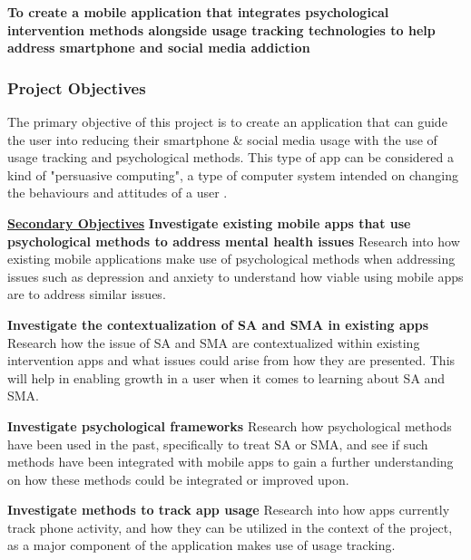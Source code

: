 \documentclass[12pt]{article}
\begin{document}
\noindent\textbf{To create a mobile application that integrates psychological intervention methods alongside usage 
tracking technologies to help address smartphone and social media addiction}

\subsubsection{Project Objectives}
The primary objective of this project is to create an application that can guide the user into reducing their smartphone 
\& social media usage with the use of usage tracking and psychological methods. This type of app can be considered a kind
of "persuasive computing", a type of computer system intended on changing the behaviours and attitudes of a user 
.\newline

\noindent\underline{\textbf{Secondary Objectives}}\newline\newline
\noindent\textbf{Investigate existing mobile apps that use psychological methods to address mental health issues}\newline
Research into how existing mobile applications make use of psychological methods when addressing issues such as 
depression and anxiety to understand how viable using mobile apps are to address similar issues.\newline

\noindent\textbf{Investigate the contextualization of SA and SMA in existing apps}\newline
Research how the issue of SA and SMA are contextualized within existing intervention apps and what issues could
arise from how they are presented. This will help in enabling growth in a user when it comes to learning about
SA and SMA.\newline

\noindent\textbf{Investigate psychological frameworks}\newline
Research how psychological methods have been used in the past, specifically to treat SA or SMA, and see if such 
methods have been integrated with mobile apps to gain a further understanding on how these methods could be 
integrated or improved upon.\newline

\noindent\textbf{Investigate methods to track app usage}\newline
Research into how apps currently track phone activity, and how they can be utilized in the context of the project,
as a major component of the application makes use of usage tracking.\newline
\end{document}
